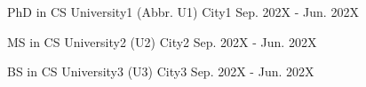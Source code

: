 \begin{cventries}
	
	
	\cventry
	{PhD in CS} %
	{University1 (Abbr. U1)} %
	{City1} %
	{Sep. 202X - Jun. 202X} %
	{
	}%
	\vspace{-3.5mm} 
	
	\cventry
	{MS in CS} %
	{University2 (U2)} %
	{City2} %
	{Sep. 202X - Jun. 202X} %
	{
	}%
	\vspace{-3.5mm} 
	
	\cventry
	{BS in CS} %
	{University3 (U3)} %
	{City3} %
	{Sep. 202X - Jun. 202X} %
	{
	}%
	\vspace{-3.5mm} 
\end{cventries}
